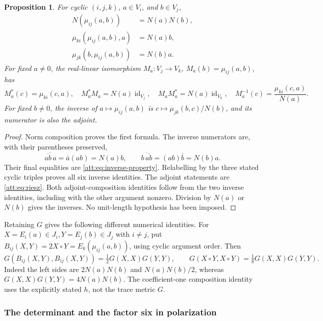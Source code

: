 \documentclass[11pt]{article}
\newtheorem{proposition}[theorem]{Proposition}
\theoremstyle{definition}
\begin{document}
\begin{proposition}\label{att:prop:norm-inverse}
For cyclic $(i,j,k)$, $a\in V_i$, and $b\in V_j$,
\begin{align}
 N(\mu_{ij}(a,b))&=N(a)N(b),\label{att:eq:composition}\\
 \mu_{ki}(\mu_{ij}(a,b),a)&=N(a)b,\label{att:eq:inverse-one}\\
 \mu_{jk}(b,\mu_{ij}(a,b))&=N(b)a.\label{att:eq:inverse-two}
\end{align}
For fixed $a\ne0$, the real-linear isomorphism
$M_a:V_j\to V_k$, $M_a(b)=\mu_{ij}(a,b)$, has
\[
 M_a^*(c)=\mu_{ki}(c,a),\quad
 M_a^*M_a=N(a)\operatorname{id}_{V_j},\quad
 M_aM_a^*=N(a)\operatorname{id}_{V_k},\quad
 M_a^{-1}(c)=\frac{\mu_{ki}(c,a)}{N(a)}.
\]
For fixed $b\ne0$, the inverse of $a\mapsto\mu_{ij}(a,b)$ is
$c\mapsto\mu_{jk}(b,c)/N(b)$, and its numerator is also the adjoint.
\end{proposition}

\begin{proof}
Norm composition proves the first formula. The inverse numerators are,
with their parentheses preserved,
\[
 \overline{\overline{ab}\,a}=\bar a(ab)=N(a)b,\qquad
 \overline{b\,\overline{ab}}=(ab)\bar b=N(b)a.
\]
Their final equalities are \eqref{att:eq:inverse-property}. Relabelling
by the three stated cyclic triples proves all six inverse identities.
The adjoint statements are \eqref{att:eq:riesz}. Both adjoint-composition
identities follow from the two inverse identities, including with the
other argument nonzero. Division by $N(a)$ or $N(b)$ gives the inverses.
No unit-length hypothesis has been imposed.
\end{proof}

Retaining $G$ gives the following different numerical identities.
For $X=E_i(a)\in J_i,Y=E_j(b)\in J_j$ with $i\ne j$, put
$B_{ij}(X,Y)=2X\circ Y=E_k(\mu_{ij}(a,b))$, using cyclic argument order.
Then
\begin{equation}
 G(B_{ij}(X,Y),B_{ij}(X,Y))=\tfrac12G(X,X)G(Y,Y),\qquad
 G(X\circ Y,X\circ Y)=\tfrac18G(X,X)G(Y,Y).
 \label{att:eq:trace-norm-factors}
\end{equation}
Indeed the left sides are $2N(a)N(b)$ and $N(a)N(b)/2$,
whereas $G(X,X)G(Y,Y)=4N(a)N(b)$. The coefficient-one composition
identity uses the explicitly stated $h$, not the trace metric $G$.

\subsubsection{The determinant and the factor six in polarization}
\end{document}
